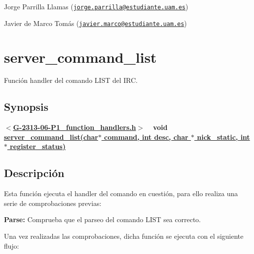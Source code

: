 \begin{DoxyItemize}
\item Jorge Parrilla Llamas (\href{mailto:jorge.parrilla@estudiante.uam.es}{\tt jorge.\+parrilla@estudiante.\+uam.\+es}) 
\item Javier de Marco Tomás (\href{mailto:javier.marco@estudiante.uam.es}{\tt javier.\+marco@estudiante.\+uam.\+es}) 
\end{DoxyItemize}\hypertarget{server_command_list}{}\section{server\+\_\+command\+\_\+list}\label{server_command_list}
Función handler del comando L\+I\+ST del I\+RC.\hypertarget{server_command_list_synopsis_list}{}\subsection{Synopsis}\label{server_command_list_synopsis_list}
{ {\bfseries $<$\hyperlink{G-2313-06-P1__function__handlers_8h}{G-\/2313-\/06-\/\+P1\+\_\+function\+\_\+handlers.\+h}$>$} ~\newline
 {\bfseries void \hyperlink{G-2313-06-P1__function__handlers_8c_af289e3cc397e24e9b8c12c35bce68285}{server\+\_\+command\+\_\+list(char$\ast$ command, int desc, char $\ast$ nick\+\_\+static, int$\ast$ register\+\_\+status)}} } \hypertarget{server_command_list_descripcion_list}{}\subsection{Descripción}\label{server_command_list_descripcion_list}
Esta función ejecuta el handler del comando en cuestión, para ello realiza una serie de comprobaciones previas\+:


\begin{DoxyItemize}
\item {\bfseries Parse\+:} Comprueba que el parseo del comando L\+I\+ST sea correcto. 
\end{DoxyItemize}

Una vez realizadas las comprobaciones, dicha función se ejecuta con el siguiente flujo\+:


